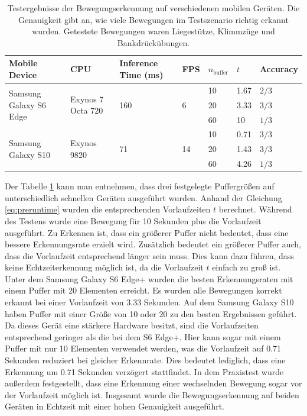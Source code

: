 \begin{table}
    \footnotesize
    \begin{tabularx}{\textwidth}{l|l|X|l|l|l|l}
        \hline
        Mobile Device & CPU & Inference Time (ms) & FPS & $n_\mathrm{buffer}$ & $t$ & Accuracy \\ \hline

        \multirow{3}{*}{Samsung Galaxy S6 Edge} & \multirow{3}{*}{Exynos 7 Octa 720} & \multirow{3}{*}{160} & \multirow{3}{*}{6} & 10 & 1.67 & $2 / 3$ \\ \cline{5-7}
        & & & & 20 & 3.33 & $3 / 3$ \\ \cline{5-7}
        & & & & 60 & 10 & $1 / 3$ \\ \hline

        \multirow{3}{*}{Samsung Galaxy S10} & \multirow{3}{*}{Exynos 9820} & \multirow{3}{*}{71} & \multirow{3}{*}{14} & 10 & 0.71 & $3/3$  \\ \cline{5-7}
        & & & & 20 & 1.43 & $3/3$ \\ \cline{5-7}
        & & & & 60 & 4.26 & $1/3$ \\ \hline
    \end{tabularx}
    \caption{Testergebnisse der Bewegungserkennung auf verschiedenen mobilen Geräten. Die Genauigkeit gibt an, wie viele Bewegungen im Testszenario richtig erkannt wurden. Getestete Bewegungen waren Liegestütze, Klimmzüge und Bankdrückübungen.}
    \label{table:android-tests}
\end{table}

Der Tabelle \ref{table:android-tests} kann man entnehmen, dass drei festgelegte
Puffergrößen auf unterschiedlich schnellen Geräten ausgeführt wurden. Anhand
der Gleichung \ref{eq:preruntime} wurden die entsprechenden Vorlaufzeiten
$t$ berechnet. Während des Testens wurde eine Bewegung für 10 Sekunden plus die
Vorlaufzeit ausgeführt. Zu Erkennen ist, dass ein größerer Puffer nicht
bedeutet, dass eine bessere Erkennungsrate erzielt wird. Zusätzlich bedeutet
ein größerer Puffer auch, dass die Vorlaufzeit entsprechend länger sein muss.
Dies kann dazu führen, dass keine Echtzeiterkennung möglich ist, da die
Vorlaufzeit $t$ einfach zu groß ist. Unter dem Samsung Galaxy S6 Edge+ wurden
die besten Erkennungsraten mit einem Puffer mit 20 Elementen erreicht. Es
wurden alle Bewegungen korrekt erkannt bei einer Vorlaufzeit von 3.33 Sekunden.
Auf dem Samsung Galaxy S10 haben Puffer mit einer Größe von 10 oder 20 zu den
besten Ergebnissen geführt. Da dieses Gerät eine stärkere Hardware besitzt,
sind die Vorlaufzeiten entsprechend geringer als die bei dem S6 Edge+. Hier
kann sogar mit einem Puffer mit nur 10 Elementen verwendet werden, was die
Vorlaufzeit auf 0.71 Sekunden reduziert bei gleicher Erkennrate. Dies bedeutet
lediglich, dass eine Erkennung um 0.71 Sekunden verzögert stattfindet. In dem
Praxistest wurde außerdem festgestellt, dass eine Erkennung einer wechselnden
Bewegung sogar vor der Vorlaufzeit möglich ist.  Insgesamt wurde die
Bewegungserkennung auf beiden Geräten in Echtzeit mit einer hohen Genauigkeit
ausgeführt.
